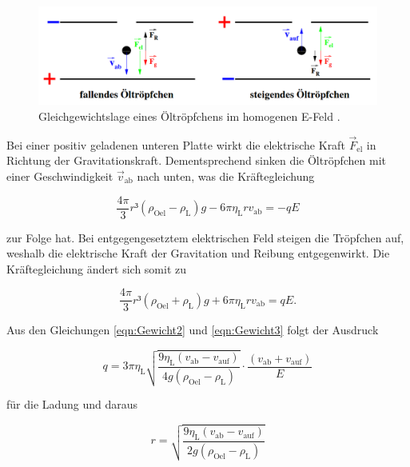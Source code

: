 \begin{figure}
    \centering
    \includegraphics[width=\textwidth]{GewichtV.png}
    \caption{Gleichgewichtslage eines Öltröpfchens im homogenen E-Feld \cite{Versuchsanleitung_v503}.}
    \label{fig:GewichtV}
\end{figure}

\noindent Bei einer positiv geladenen unteren Platte wirkt die elektrische Kraft $\vec{F}_\text{el}$
in Richtung der Gravitationskraft. Dementsprechend sinken die Öltröpfchen mit einer Geschwindigkeit $\vec{v}_\text{ab}$
nach unten, was die Kräftegleichung 

\begin{equation}
\label{eqn:Gewicht2}
    \frac{4\pi}{3}r³\left(\rho_\text{Oel}-\rho_\text{L}\right)g - 6\pi{}\eta_\text{L}rv_\text{ab} = -qE
\end{equation}

\noindent zur Folge hat. Bei entgegengesetztem elektrischen Feld steigen die Tröpfchen auf, weshalb die
elektrische Kraft der Gravitation und Reibung entgegenwirkt. Die Kräftegleichung ändert sich somit zu 

\begin{equation}
\label{eqn:Gewicht3}
\frac{4\pi}{3}r³\left(\rho_\text{Oel}+\rho_\text{L}\right)g + 6\pi{}\eta_\text{L}rv_\text{ab} = qE.
\end{equation}

\noindent Aus den Gleichungen \eqref{eqn:Gewicht2} und \eqref{eqn:Gewicht3} folgt der Ausdruck

\begin{equation*}
    q = 3\pi{}\eta_\text{L}\sqrt{\frac{9\eta_\text{L}\left(v_\text{ab}-v_\text{auf}\right)}{4g\left(\rho_\text{Oel}-\rho_\text{L}\right)}}\cdot\frac{\left(v_\text{ab}+v_\text{auf}\right)}{E}
\end{equation*}

\noindent für die Ladung und daraus

\begin{equation*}
    r = \sqrt{\frac{9\eta_\text{L}\left(v_\text{ab}-v_\text{auf}\right)}{2g\left(\rho_\text{Oel}-\rho_\text{L}\right)}}
\end{equation*}

